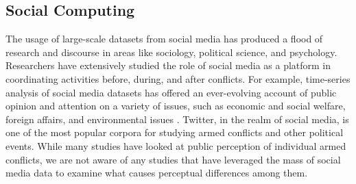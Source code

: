 \subsection{Social Computing}
The usage of large-scale datasets from social media has produced a flood of research and discourse in areas like sociology, political science, and psychology. Researchers have extensively studied the role of social media as a platform in coordinating activities before, during, and after conflicts. For example, time-series analysis of social media datasets has offered an ever-evolving account of public opinion and attention on a variety of issues, such as economic and social welfare, foreign affairs, and environmental issues \cite{RussellNeuman2014}. Twitter, in the realm of social media, is one of the most popular corpora for studying armed conflicts and other political events. While many studies have looked at public perception of individual armed conflicts, we are not aware of any studies that have leveraged the mass of social media data to examine what causes perceptual differences among them.